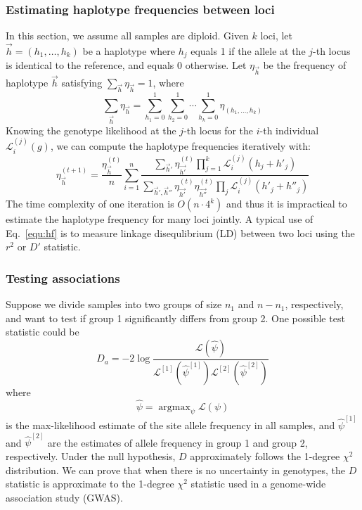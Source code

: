 \documentclass{bioinfo}
\DeclareMathOperator*{\argmax}{argmax}
\begin{document}
\begin{methods}
\subsubsection{Estimating haplotype frequencies between loci}
In this section, we assume all samples are diploid. Given $k$ loci,
let $\vec{h}=(h_1,\ldots,h_k)$ be a haplotype where $h_j$ equals 1 if
the allele at the $j$-th locus is identical to the reference, and equals 0 otherwise.
Let $\eta_{\vec{h}}$ be the frequency of haplotype $\vec{h}$ satisfying
$\sum_{\vec{h}}\eta_{\vec{h}}=1$, where
$$
\sum_{\vec{h}}\eta_{\vec{h}}=\sum_{h_1=0}^1\sum_{h_2=0}^1\cdots\sum_{h_k=0}^1\eta_{(h_1,\ldots,h_k)}
$$
Knowing the genotype likelihood at the $j$-th locus for the $i$-th individual $\mathcal{L}^{(j)}_i(g)$, we
can compute the haplotype frequencies iteratively with:
\begin{equation}\label{equ:hf}
\eta^{(t+1)}_{\vec{h}}=\frac{\eta_{\vec{h}}^{(t)}}{n}\sum_{i=1}^n\frac{\sum_{\vec{h}'}\eta_{\vec{h'}}^{(t)}\prod_{j=1}^k\mathcal{L}^{(j)}_i(h_j+h'_j)}
{\sum_{\vec{h}',\vec{h}''}\eta_{\vec{h'}}^{(t)}\eta_{\vec{h''}}^{(t)}\prod_{j}\mathcal{L}^{(j)}_i(h'_j+h''_j)}
\end{equation}
The time complexity of one iteration is $O(n\cdot 4^k)$ and thus
it is impractical to estimate the haplotype frequency for many loci jointly.
A typical use of Eq.~\eqref{equ:hf} is to measure linkage disequlibrium
(LD) between two loci using the $r^2$ or $D'$ statistic.

\subsubsection{Testing associations}
Suppose we divide samples into two groups of size $n_1$ and $n-n_1$, respectively, and
want to test if group 1 significantly differs from group 2. One possible test statistic
could be
\begin{equation}
D_a=-2\log\frac{\mathcal{L}(\hat{\psi})}{\mathcal{L}^{[1]}(\hat{\psi}^{[1]})\mathcal{L}^{[2]}(\hat{\psi}^{[2]})}
\end{equation}
where
\[
\hat{\psi}=\argmax_{\psi}\mathcal{L}(\psi)
\]
is the max-likelihood estimate of the site allele frequency in all samples,
and $\hat{\psi}^{[1]}$ and $\hat{\psi}^{[2]}$ are the estimates of allele frequency in group 1 and group 2, respectively.
Under the null hypothesis, $D$ approximately follows the 1-degree $\chi^2$ distribution.
We can prove that when there is no uncertainty in genotypes, the $D$ statistic
is approximate to the 1-degree $\chi^2$ statistic used in a genome-wide association study (GWAS).


\end{methods}
\end{document}
